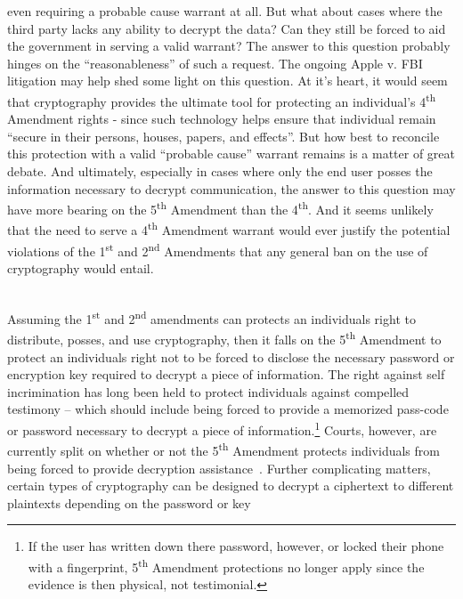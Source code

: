 \begin{packed_desc}
  even requiring a probable cause warrant at all. But what about cases
  where the third party lacks any ability to decrypt the data? Can
  they still be forced to aid the government in serving a valid
  warrant?  The answer to this question probably hinges on the
  ``reasonableness'' of such a request. The ongoing Apple v. FBI
  litigation may help shed some light on this question. At it's heart,
  it would seem that cryptography provides the ultimate tool for
  protecting an individual's 4\textsuperscript{th} Amendment rights -
  since such technology helps ensure that individual remain ``secure
  in their persons, houses, papers, and effects''. But how best to
  reconcile this protection with a valid ``probable cause'' warrant
  remains is a matter of great debate. And ultimately, especially in
  cases where only the end user posses the information necessary to
  decrypt communication, the answer to this question may have more
  bearing on the 5\textsuperscript{th} Amendment than the
  4\textsuperscript{th}. And it seems unlikely that the need to serve
  a 4\textsuperscript{th} Amendment warrant would ever justify the
  potential violations of the 1\textsuperscript{st} and
  2\textsuperscript{nd} Amendments that any general ban on the use of
  cryptography would entail.
\item[5\textsuperscript{th} Amendment] \hfill \\ Assuming the
  1\textsuperscript{st} and 2\textsuperscript{nd} amendments can
  protects an individuals right to distribute, posses, and use
  cryptography, then it falls on the 5\textsuperscript{th} Amendment
  to protect an individuals right not to be forced to disclose the
  necessary password or encryption key required to decrypt a piece of
  information. The right against self incrimination has long been held
  to protect individuals against compelled testimony -- which should
  include being forced to provide a memorized pass-code or password
  necessary to decrypt a piece of information.\footnote{If the user
    has written down there password, however, or locked their phone
    with a fingerprint, 5\textsuperscript{th} Amendment protections no
    longer apply since the evidence is then physical, not
    testimonial.}  Courts, however, are currently split on whether or
  not the 5\textsuperscript{th} Amendment protects individuals from
  being forced to provide decryption assistance~\cite{usvboucher,
    commonwealthvgelfgatt, usvdoe}. Further complicating matters,
  certain types of cryptography can be designed to decrypt a
  ciphertext to different plaintexts depending on the password or key

\end{packed_desc}
